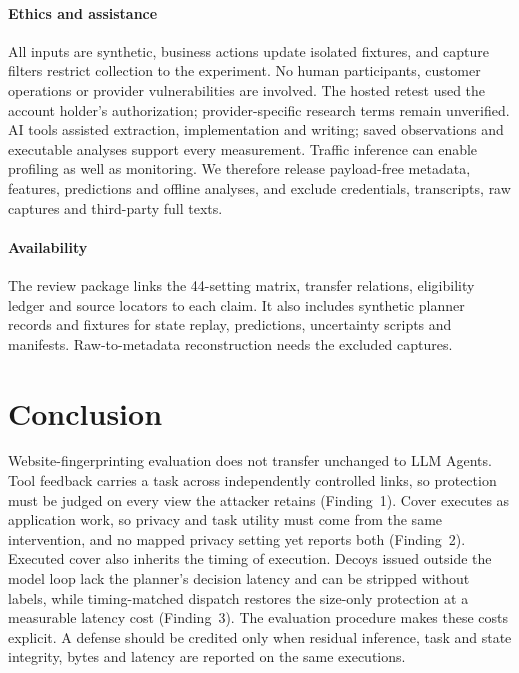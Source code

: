 \paragraph{Ethics and assistance}
All inputs are synthetic, business actions update isolated fixtures, and capture filters restrict collection to the experiment. No human participants, customer operations or provider vulnerabilities are involved. The hosted retest used the account holder's authorization; provider-specific research terms remain unverified. AI tools assisted extraction, implementation and writing; saved observations and executable analyses support every measurement. Traffic inference can enable profiling as well as monitoring. We therefore release payload-free metadata, features, predictions and offline analyses, and exclude credentials, transcripts, raw captures and third-party full texts.

\paragraph{Availability}
The review package links the 44-setting matrix, transfer relations, eligibility ledger and source locators to each claim. It also includes synthetic planner records and fixtures for state replay, predictions, uncertainty scripts and manifests. Raw-to-metadata reconstruction needs the excluded captures.

\section{Conclusion}
Website-fingerprinting evaluation does not transfer unchanged to LLM Agents. Tool feedback carries a task across independently controlled links, so protection must be judged on every view the attacker retains (Finding~1). Cover executes as application work, so privacy and task utility must come from the same intervention, and no mapped privacy setting yet reports both (Finding~2). Executed cover also inherits the timing of execution. Decoys issued outside the model loop lack the planner's decision latency and can be stripped without labels, while timing-matched dispatch restores the size-only protection at a measurable latency cost (Finding~3). The evaluation procedure makes these costs explicit. A defense should be credited only when residual inference, task and state integrity, bytes and latency are reported on the same executions.
